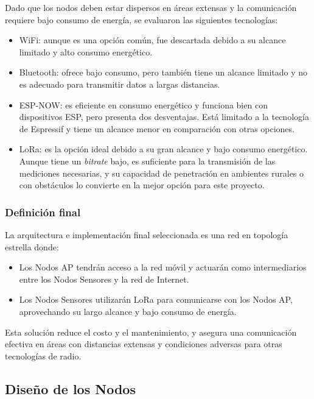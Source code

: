 Dado que los nodos deben estar dispersos en áreas extensas y la comunicación requiere bajo consumo de energía, se evaluaron las siguientes tecnologías:
\begin{itemize}
    \item WiFi: aunque es una opción común, fue descartada debido a su alcance limitado y alto consumo energético.

    \item Bluetooth: ofrece bajo consumo, pero también tiene un alcance limitado y no es adecuado para transmitir datos a largas distancias.
    
    \item ESP-NOW: es eficiente en consumo energético y funciona bien con dispositivos ESP, pero presenta dos desventajas. Está limitado a la tecnología de Espressif y tiene un alcance menor en comparación con otras opciones.

    \item LoRa: es la opción ideal debido a su gran alcance y bajo consumo energético. Aunque tiene un \textit{bitrate} bajo, es suficiente para la transmisión de las mediciones necesarias, y su capacidad de penetración en ambientes rurales o con obstáculos lo convierte en la mejor opción para este proyecto.
    
\end{itemize}

\subsubsection{Definición final}

La arquitectura e implementación final seleccionada es una red en topología estrella donde:

\begin{itemize}
    \item Los Nodos AP tendrán acceso a la red móvil y actuarán como intermediarios entre los Nodos Sensores y la red de Internet.
    \item Los Nodos Sensores utilizarán LoRa para comunicarse con los Nodos AP, aprovechando su largo alcance y bajo consumo de energía.
\end{itemize}

Esta solución reduce el costo y el mantenimiento, y asegura una comunicación efectiva en áreas con distancias extensas y condiciones adversas para otras tecnologías de radio.

\subsection{Diseño de los Nodos}

